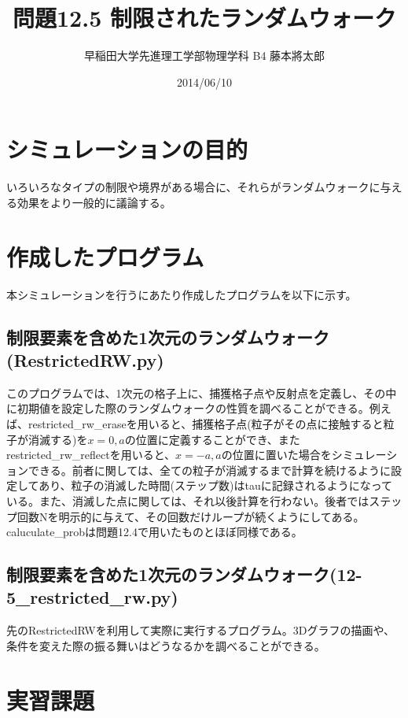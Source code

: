 \documentclass{jsarticle}
\title{問題12.5 制限されたランダムウォーク}
\author{早稲田大学先進理工学部物理学科 B4 藤本將太郎}
\date{2014/06/10}
\begin{document}
\maketitle
    
    \section{シミュレーションの目的}
        いろいろなタイプの制限や境界がある場合に、それらがランダムウォークに与える効果をより一般的に議論する。
        
    \section{作成したプログラム}
        本シミュレーションを行うにあたり作成したプログラムを以下に示す。
        
        \subsection{制限要素を含めた1次元のランダムウォーク(RestrictedRW.py)}
            このプログラムでは、1次元の格子上に、捕獲格子点や反射点を定義し、その中に初期値を設定した際のランダムウォークの性質を調べることができる。例えば、restricted\_rw\_eraseを用いると、捕獲格子点(粒子がその点に接触すると粒子が消滅する)を$x=0,a$の位置に定義することができ、またrestricted\_rw\_reflectを用いると、$x=-a,a$の位置に置いた場合をシミュレーションできる。前者に関しては、全ての粒子が消滅するまで計算を続けるように設定してあり、粒子の消滅した時間(ステップ数)はtauに記録されるようになっている。また、消滅した点に関しては、それ以後計算を行わない。後者ではステップ回数Nを明示的に与えて、その回数だけループが続くようにしてある。caluculate\_probは問題12.4で用いたものとほぼ同様である。
            
        
        \subsection{制限要素を含めた1次元のランダムウォーク(12-5\_restricted\_rw.py)}
            先のRestrictedRWを利用して実際に実行するプログラム。3Dグラフの描画や、条件を変えた際の振る舞いはどうなるかを調べることができる。
            
        
    \section{実習課題}
    
\end{document}
